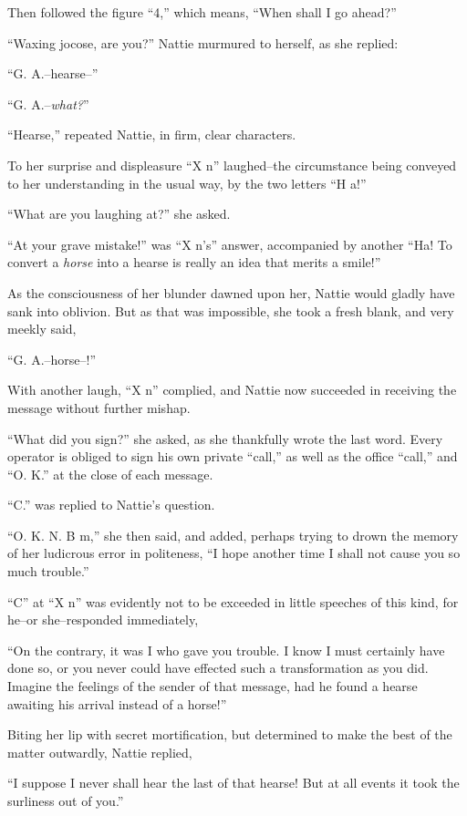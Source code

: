 Then followed the figure ``4,'' which means, ``When shall I go ahead?''

``Waxing jocose, are you?'' Nattie murmured to herself, as she replied:

``G. A.--hearse--''

``G. A.--\emph{what?}''

``Hearse,'' repeated Nattie, in firm, clear characters.

To her surprise and displeasure ``X n'' laughed--the circumstance being
conveyed to her understanding in the usual way, by the two letters ``H
a!''

``What are you laughing at?'' she asked.

``At your grave mistake!'' was ``X n's'' answer, accompanied by another ``Ha!
To convert a \emph{horse} into a hearse is really an idea that merits a smile!''

As the consciousness of her blunder dawned upon her, Nattie would gladly
have sank into oblivion. But as that was impossible, she took a fresh
blank, and very meekly said,

``G. A.--horse--!''

With another laugh, ``X n'' complied, and Nattie now succeeded in
receiving the message without further mishap.

``What did you sign?'' she asked, as she thankfully wrote the last word.
Every operator is obliged to sign his own private ``call,'' as well as the
office ``call,'' and ``O. K.'' at the close of each message.

``C.'' was replied to Nattie's question.

``O. K. N. B m,'' she then said, and added, perhaps trying to drown the
memory of her ludicrous error in politeness, ``I hope another time I
shall not cause you so much trouble.''

``C'' at ``X n'' was evidently not to be exceeded in little speeches of
this kind, for he--or she--responded immediately,

``On the contrary, it was I who gave you trouble. I know I must certainly
have done so, or you never could have effected such a transformation as
you did. Imagine the feelings of the sender of that message, had he
found a hearse awaiting his arrival instead of a horse!''

Biting her lip with secret mortification, but determined to make the
best of the matter outwardly, Nattie replied,

``I suppose I never shall hear the last of that hearse! But at all events
it took the surliness out of you.''

